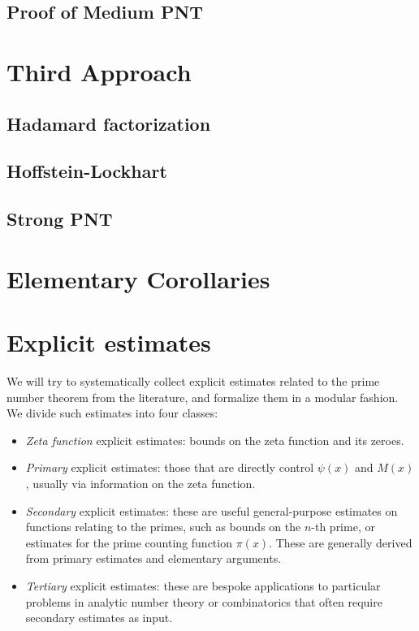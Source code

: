 \section{Proof of Medium PNT}


\chapter{Third Approach}\label{third-approach-chapter}

\section{Hadamard factorization}

\section{Hoffstein-Lockhart}

\section{Strong PNT}

\chapter{Elementary Corollaries}\label{corollaries-chapter}


\chapter{Explicit estimates}\label{explicit-chapter}

We will try to systematically collect explicit estimates related to the prime number theorem from
the literature, and formalize them in a modular fashion.  We divide such estimates into four
classes:

\begin{itemize}
    \item \emph{Zeta function} explicit estimates: bounds on the zeta function and its zeroes.
    \item \emph{Primary} explicit estimates: those that are directly control $\psi(x)$ and $M(x)$, usually via information on the zeta function.
    \item \emph{Secondary} explicit estimates: these are useful general-purpose estimates on
    functions relating to the primes, such as bounds on the $n$-th prime, or estimates for the prime
    counting function $\pi(x)$.  These are generally derived from primary estimates and elementary arguments.
    \item \emph{Tertiary} explicit estimates: these are bespoke applications to particular problems
    in analytic number theory or combinatorics that often require secondary estimates as input.
\end{itemize}

